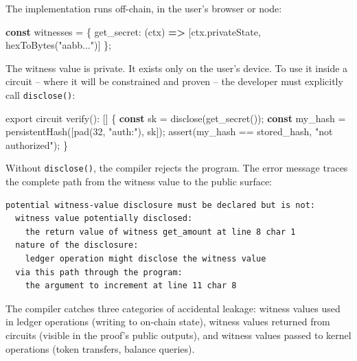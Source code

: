 \documentclass[
  11pt,
  openany]{report}
\newenvironment{Shaded}{\begin{snugshade}}{\end{snugshade}}
\newcommand{\AttributeTok}[1]{\textcolor[rgb]{0.75,0.60,1.00}{#1}}
\newcommand{\DataTypeTok}[1]{\textcolor[rgb]{0.75,0.60,1.00}{#1}}
\newcommand{\DecValTok}[1]{\textcolor[rgb]{0.91,0.66,0.43}{#1}}
\newcommand{\FunctionTok}[1]{\textcolor[rgb]{0.49,0.78,0.89}{#1}}
\newcommand{\ImportTok}[1]{\textcolor[rgb]{0.66,0.83,0.63}{#1}}
\newcommand{\KeywordTok}[1]{\textcolor[rgb]{0.62,0.65,1.00}{\textbf{#1}}}
\newcommand{\NormalTok}[1]{\textcolor[rgb]{0.78,0.80,0.85}{#1}}
\newcommand{\OperatorTok}[1]{\textcolor[rgb]{0.78,0.80,0.85}{#1}}
\newcommand{\StringTok}[1]{\textcolor[rgb]{0.66,0.83,0.63}{#1}}
\renewcommand{\textbf}[1]{{\bfseries\color{MidnightBold}#1}}
\renewenvironment{Shaded}{%
  \begin{tcolorbox}[
    colback=MidnightCode,
    colframe=MidnightBorder,
    arc=4pt,
    boxrule=0.5pt,
    left=8pt, right=8pt, top=6pt, bottom=6pt,
    breakable, enhanced
  ]%
}{\end{tcolorbox}}
\begin{document}
The implementation runs off-chain, in the user's browser or node:

\begin{Shaded}
\begin{Highlighting}[]
\KeywordTok{const}\NormalTok{ witnesses }\OperatorTok{=}\NormalTok{ \{}
  \DataTypeTok{get\_secret}\OperatorTok{:}\NormalTok{ (ctx) }\KeywordTok{=\textgreater{}}\NormalTok{ [ctx}\OperatorTok{.}\AttributeTok{privateState}\OperatorTok{,} \FunctionTok{hexToBytes}\NormalTok{(}\StringTok{"aabb..."}\NormalTok{)]}
\NormalTok{\}}\OperatorTok{;}
\end{Highlighting}
\end{Shaded}

The witness value is private. It exists only on the user's device. To use it
inside a circuit -- where it will be constrained and proven -- the developer
must explicitly call \texttt{disclose()}:

\begin{Shaded}
\begin{Highlighting}[]
\ImportTok{export}\NormalTok{ circuit }\FunctionTok{verify}\NormalTok{()}\OperatorTok{:}\NormalTok{ [] \{}
  \KeywordTok{const}\NormalTok{ sk }\OperatorTok{=} \FunctionTok{disclose}\NormalTok{(}\FunctionTok{get\_secret}\NormalTok{())}\OperatorTok{;}
  \KeywordTok{const}\NormalTok{ my\_hash }\OperatorTok{=} \FunctionTok{persistentHash}\NormalTok{([}\FunctionTok{pad}\NormalTok{(}\DecValTok{32}\OperatorTok{,} \StringTok{"auth:"}\NormalTok{)}\OperatorTok{,}\NormalTok{ sk])}\OperatorTok{;}
  \FunctionTok{assert}\NormalTok{(my\_hash }\OperatorTok{==}\NormalTok{ stored\_hash}\OperatorTok{,} \StringTok{"not authorized"}\NormalTok{)}\OperatorTok{;}
\NormalTok{\}}
\end{Highlighting}
\end{Shaded}

Without \texttt{disclose()}, the compiler rejects the program. The error message
traces the complete path from the witness value to the public surface:

\begin{verbatim}
potential witness-value disclosure must be declared but is not:
  witness value potentially disclosed:
    the return value of witness get_amount at line 8 char 1
  nature of the disclosure:
    ledger operation might disclose the witness value
  via this path through the program:
    the argument to increment at line 11 char 8
\end{verbatim}

The compiler catches three categories of accidental leakage: witness values used
in ledger operations (writing to on-chain state), witness values returned from
circuits (visible in the proof's public outputs), and witness values passed to
kernel operations (token transfers, balance queries).
\end{document}
